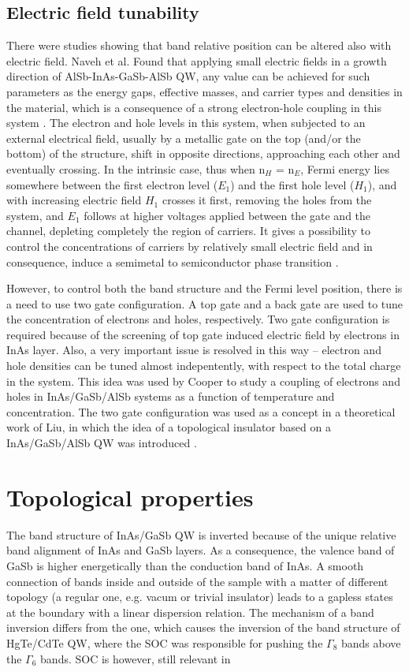 \documentclass[titlepage,a4paper]{book}
\begin{document}
\subsection{Electric field tunability}
There were studies showing that band relative position can be altered also with electric field. Naveh et al. Found that applying small electric fields in a growth direction of AlSb-InAs-GaSb-AlSb QW, any value can be achieved for such parameters as the energy gaps, effective masses, and carrier types and densities in the material, which is a consequence of a strong electron-hole coupling in this system \cite{Naveh_ElectricField}. The electron and hole levels in this system, when subjected to an external electrical field, usually by a metallic gate on the top (and/or the bottom) of the structure, shift in opposite directions, approaching each other and eventually crossing. In the intrinsic case, thus when n$_H$ = n$_E$, Fermi energy lies somewhere between the first electron level ($E_1$) and the first hole level ($H_1$), and with increasing electric field $H_1$ crosses it first, removing the holes from the system, and $E_1$ follows at higher voltages applied between the gate and the channel, depleting completely the region of carriers. It gives a possibility to control the concentrations of carriers by relatively small electric field and in consequence, induce a semimetal to semiconductor phase transition \cite{Mendez_ElectricField}.

However, to control both the band structure and the Fermi level position, there is a need to use two gate configuration. A top gate and a back gate are used to tune the concentration of electrons and holes, respectively. Two gate configuration is required because of the screening of top gate induced electric field by electrons in InAs layer. Also, a very important issue is resolved in this way – electron and hole densities can be tuned almost indepentently, with respect to the total charge in the system. This idea was used by Cooper \cite{Cooper_ElectricField} to study a coupling of electrons and holes in InAs/GaSb/AlSb systems as a function of temperature and concentration. The two gate configuration was used as a concept in a theoretical work of Liu, in which the idea of a topological insulator based on a InAs/GaSb/AlSb QW was introduced \cite{Liu_Topology}.

\section{Topological properties}
The band structure of InAs/GaSb QW is inverted because of the unique relative band alignment of InAs and GaSb layers. As a consequence, the valence band of GaSb is higher energetically than the conduction band of InAs. A smooth connection of bands inside and outside of the sample with a matter of different topology (a regular one, e.g. vacum or trivial insulator) leads to a gapless states at the boundary with a linear dispersion relation. The mechanism of a band inversion differs from the one, which causes the inversion of the band structure of HgTe/CdTe QW, where the SOC was responsible for pushing the $\Gamma_8$ bands above the $\Gamma_6$ bands. SOC is however, still relevant in
\end{document}
